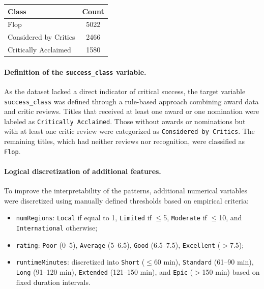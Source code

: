 \documentclass[10pt]{article}
\begin{document}
\begin{minipage}{0.35\textwidth}
\centering
\begin{tabular}{lc}
\toprule
\textbf{Class} & \textbf{Count} \\
\midrule
Flop & 5022 \\
Considered by Critics & 2466 \\
Critically Acclaimed & 1580 \\
\bottomrule
\end{tabular}
\label{tab:success_class}
\end{minipage}
\hfill
\begin{minipage}{0.6\textwidth}
\paragraph{Definition of the \texttt{success\_class} variable.}
As the dataset lacked a direct indicator of critical success, the target variable \texttt{success\_class} was defined through a rule-based approach combining award data and critic reviews. Titles that received at least one award or one nomination were labeled as \texttt{Critically Acclaimed}. Those without awards or nominations but with at least one critic review were categorized as \texttt{Considered by Critics}. The remaining titles, which had neither reviews nor recognition, were classified as \texttt{Flop}.
\end{minipage}


\paragraph{Logical discretization of additional features.}
To improve the interpretability of the patterns, additional numerical variables were discretized using manually defined thresholds based on empirical criteria:

\begin{itemize}
  \item \texttt{numRegions}: \texttt{Local} if equal to 1, \texttt{Limited} if $\leq$5, \texttt{Moderate} if $\leq$10, and \texttt{International} otherwise;
  \item \texttt{rating}: \texttt{Poor} (0--5), \texttt{Average} (5--6.5), \texttt{Good} (6.5--7.5), \texttt{Excellent} ($>$7.5);
\item \texttt{runtimeMinutes}: discretized into \texttt{Short} ($\leq$60 min), \texttt{Standard} (61–90 min), \texttt{Long} (91–120 min), \texttt{Extended} (121–150 min), and \texttt{Epic} ($>$150 min) based on fixed duration intervals.

\end{itemize}
\end{document}
